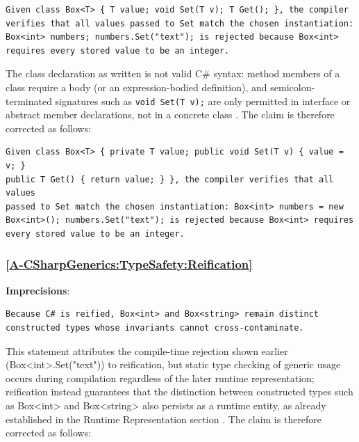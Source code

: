 \documentclass[11pt]{report}
\begin{document}
\begin{Verbatim}[breaklines=true]
Given class Box<T> { T value; void Set(T v); T Get(); }, the compiler
verifies that all values passed to Set match the chosen instantiation:
Box<int> numbers; numbers.Set("text"); is rejected because Box<int>
requires every stored value to be an integer.
\end{Verbatim}

The class declaration as written is not valid C\# syntax: method members
of a class require a body (or an expression-bodied definition), and
semicolon-terminated signatures such as \texttt{void Set(T v);} are only
permitted in interface or abstract member declarations, not in a concrete
class \cite{ecma334_2023}. The claim is therefore corrected as follows:

\begin{Verbatim}[breaklines=true]
Given class Box<T> { private T value; public void Set(T v) { value = v; }
public T Get() { return value; } }, the compiler verifies that all values
passed to Set match the chosen instantiation: Box<int> numbers = new
Box<int>(); numbers.Set("text"); is rejected because Box<int> requires
every stored value to be an integer.
\end{Verbatim}

\subsubsection*{\hyperref[A-CSharpGenerics:TypeSafety:Reification]{\ref*{A-CSharpGenerics:TypeSafety:Reification} }}
\noindent\textbf{Imprecisions}:

\begin{Verbatim}[breaklines=true]
Because C# is reified, Box<int> and Box<string> remain distinct
constructed types whose invariants cannot cross-contaminate.
\end{Verbatim}

This statement attributes the compile-time rejection shown earlier
(Box<int>.Set("text")) to reification, but static type checking of generic
usage occurs during compilation regardless of the later runtime
representation; reification instead guarantees that the distinction
between constructed types such as Box<int> and Box<string> also persists
as a runtime entity, as already established in the Runtime Representation
section \cite{kennedy2001}. The claim is therefore corrected as follows:
\end{document}
